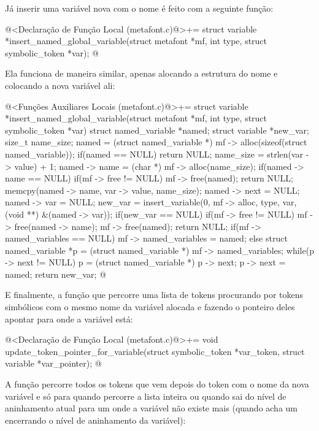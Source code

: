 Já inserir uma variável nova com o nome é feito com a seguinte função:

\iniciocodigo
@<Declaração de Função Local (metafont.c)@>+=
struct variable *insert_named_global_variable(struct metafont *mf,
                                             int type,
                                             struct symbolic_token *var);
@
\fimcodigo

Ela funciona de maneira similar, apenas alocando a estrutura do nome e
colocando a nova variável ali:

\iniciocodigo
@<Funções Auxiliares Locais (metafont.c)@>+=
struct variable *insert_named_global_variable(struct metafont *mf,
                                             int type,
                                             struct symbolic_token *var){
  struct named_variable *named;
  struct variable *new_var;
  size_t name_size;
  named = (struct named_variable *)
              mf -> alloc(sizeof(struct named_variable));
  if(named == NULL)
    return NULL;
  name_size = strlen(var -> value) + 1;
  named -> name = (char *) mf -> alloc(name_size);
  if(named -> name == NULL){
    if(mf -> free != NULL)
      mf -> free(named);
    return NULL;
  }
  memcpy(named -> name, var -> value, name_size);
  named -> next = NULL;
  named -> var = NULL;
  new_var = insert_variable(0, mf -> alloc, type, var,
                           (void **) &(named -> var));
  if(new_var == NULL){
    if(mf -> free != NULL){
      mf -> free(named -> name);
      mf -> free(named);
      return NULL;
    }
  }
  if(mf -> named_variables == NULL){
    mf -> named_variables = named;
  }  
  else{
    struct named_variable *p = (struct named_variable *)
                                   mf -> named_variables;
    while(p -> next != NULL)
      p = (struct named_variable *) p -> next;
    p -> next = named;
  }
  return new_var;
}
@
\fimcodigo

E finalmente, a função que percorre uma lista de tokens procurando por
tokens simbólicos com o mesmo nome da variável alocada e fazendo o
ponteiro deles apontar para onde a variável está:

\iniciocodigo
@<Declaração de Função Local (metafont.c)@>+=
void update_token_pointer_for_variable(struct symbolic_token *var_token,
                                      struct variable *var_pointer);
@
\fimcodigo

A função percorre todos os tokens que vem depois do token com o nome
da nova variável e só para quando percorre a lista inteira ou quando
sai do nível de aninhamento atual para um onde a variável não existe
mais (quando acha um  encerrando o nível de
aninhamento da variável):

